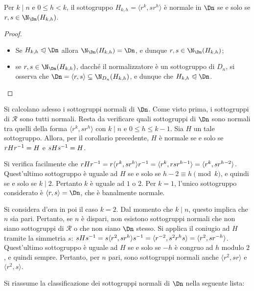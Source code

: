 \documentclass[11pt]{scrartcl}
\begin{document}
	\begin{corollary}
		Per $k\mid n$ e $0\leq h < k$, il sottogruppo $H_{k, h} = \langle r^k, sr^h\rangle$
		è normale in $\Dn$ se e solo se $r, s \in \N_{\Dn}(H_{k, h})$.
	\end{corollary}
	
	\begin{proof}~
		\begin{itemize}
			\item Se $H_{k, h}\trianglelefteqslant \Dn$ allora $\N_{\Dn}(H_{k, h}) = \Dn$, 
			e dunque $r, s \in \N_{\Dn}(H_{k, h})$;
			\item se $r, s \in \N_{\Dn}(H_{k, h})$, dacché il normalizzatore è un
			sottogruppo di $D_n$, si osserva che $\Dn = \langle r, s\rangle \subseteq
			\N_{D_n}(H_{k, h})$, e dunque che $H_{k, h} \trianglelefteqslant \Dn$.
		\end{itemize}
	\end{proof}
	
	Si calcolano adesso i sottogruppi normali di $\Dn$. Come visto prima, i sottogruppi
	di $\mathcal{R}$ sono tutti normali. Resta da verificare quali sottogruppi di $\Dn$
	sono normali tra quelli
	della forma $\langle r^k, sr^h \rangle$ con $k \mid n$ e $0 \leq h \leq k-1$.
	Sia $H$ un tale sottogruppo. Allora, per il corollario precedente, $H$ è normale
	se e solo se $rHr^{-1} = H$ e $sHs^{-1} = H$. \medskip
	
	
	Si verifica facilmente
	che $rHr^{-1} = r \langle r^k, sr^h \rangle r^{-1} = \langle r^k, rsr^{h-1} \rangle
	= \langle r^k, sr^{h-2} \rangle$. Quest'ultimo sottogruppo è uguale ad $H$ se e
	solo se $h-2 \equiv h \pmod k$, e quindi se e solo se $k \mid 2$. Pertanto
	$k$ è uguale ad $1$ o $2$. Per $k = 1$, l'unico sottogruppo considerato è
	$\langle r, s \rangle = \Dn$, che
	è banalmente normale. \medskip
	
	
	Si considera d'ora in poi il caso $k = 2$. Dal momento che $k \mid n$, questo
	implica che $n$ sia pari. Pertanto, se $n$ è dispari, non esistono sottogruppi
	normali che non siano sottogruppi di $\mathcal{R}$ o che non siano $\Dn$ stesso.
	Si applica il coniugio ad $H$ tramite la simmetria $s$:
	$sHs^{-1} = s \langle r^2, sr^h \rangle s^{-1} = \langle r^{-2}, s^2 r^h s \rangle =
	\langle r^2, s r^{-h} \rangle$. Quest'ultimo sottogruppo è uguale ad $H$ se e solo
	se $-h$ è congruo ad $h$ modulo $2$, e quindi sempre. Pertanto, per $n$ pari,
	sono sottogruppi normali anche $\langle r^2, sr \rangle$ e $\langle r^2, s \rangle$. \medskip
	
	Si riassume la classificazione dei sottogruppi normali di $\Dn$ nella seguente lista:
	
\end{document}

